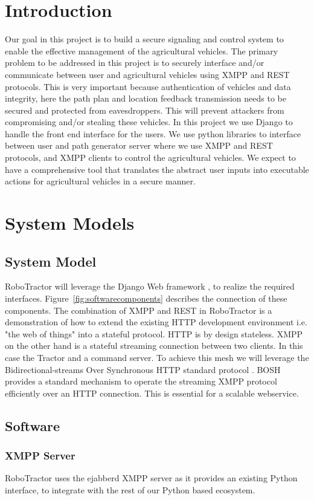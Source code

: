 \documentclass[conference,12pt]{IEEEtran}
\begin{document}
\section{Introduction}
Our goal in this project is to build a secure signaling and control system to
enable the effective management of the agricultural vehicles. The primary
problem to be addressed in this project is to securely interface and/or
communicate between user and agricultural vehicles using XMPP and REST
protocols. This is very important because authentication of vehicles and data
integrity, here the path plan and location feedback transmission needs to be
secured and protected from eavesdroppers. This will prevent attackers from
compromising and/or stealing these vehicles. In this project we use Django to
handle the front end interface for the users. We use python libraries to
interface between user and path generator server where we use XMPP and REST
protocols, and XMPP clients to control the agricultural vehicles. We expect to
have a comprehensive tool that translates the abstract user inputs into
executable actions for agricultural vehicles in a secure manner.
\section{System Models}

\subsection{System Model}
RoboTractor will leverage the Django Web framework \autocite{_django_2014}
, to realize the required
interfaces.  Figure~\ref{fig:softwarecomponents} describes the connection of
these components.  The combination of XMPP and REST in RoboTractor is
a demonstration of how to extend the existing HTTP development environment
i.e. "the web of things" into a stateful protocol. HTTP is by design
stateless. XMPP on the other hand is a stateful streaming connection between two
clients. In this case the Tractor and a command server.  To achieve this mesh we
will leverage the Bidirectional-streams Over Synchronous HTTP standard
protocol \autocite{paterson_bidirectional-streams_2010}. BOSH provides
a standard mechanism to operate the streaming XMPP protocol efficiently over an
HTTP connection. This is essential for a scalable webservice. 
\subsection{Software}
\subsubsection{XMPP Server}
RoboTractor uses the ejabberd \autocite{_ejabberd} XMPP server as it provides an existing Python
interface, to integrate with the rest of our Python based ecosystem.
\end{document}

